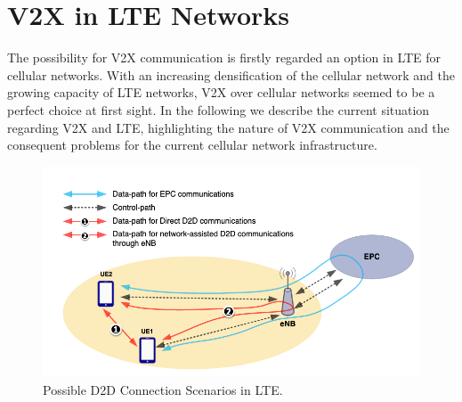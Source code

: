 \documentclass[conference,12pt,onecolumn]{IEEEtran}
\begin{document}
\section{V2X in LTE Networks}
The possibility for V2X communication is firstly regarded an option in LTE for cellular networks. With an increasing densification of the cellular network and the growing capacity of LTE networks, V2X over cellular networks seemed to be a perfect choice at first sight. In the following we describe the current situation regarding V2X and LTE, highlighting the nature of V2X communication and the consequent problems for the current cellular network infrastructure.

\begin{figure} [ht]
   \centering
   \includegraphics[width=0.7\linewidth]{_Graphics/lte_d2d_usecases.png}
  \caption{Possible D2D Connection Scenarios in LTE. \cite{gunes2014}}
  \label{fig:lte_d2d_usecases}
\end{figure}
\end{document}
